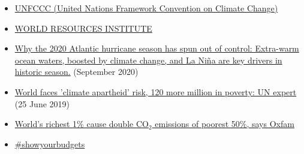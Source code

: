 \documentclass[12pt]{article}
\begin{document}
\begin{itemize}
 \vspace{-.2cm} \item \href{https://unfccc.int/}{UNFCCC (United Nations Framework Convention on Climate Change)} 
 \vspace{-.2cm} \item \href{https://www.wri.org/}{WORLD RESOURCES INSTITUTE} 
 \vspace{-.2cm} \item \href{https://www.washingtonpost.com/weather/2020/09/23/atlantic-hurricanes-record-2020/?utm_campaign=Carbon%20Brief%20Daily%20Briefing&utm_medium=email&utm_source=Revue%20newsletter}{Why the 2020 Atlantic hurricane season has spun out of control: Extra-warm ocean waters, boosted by climate change, and La Ni{\~n}a are key drivers in historic season.} (September 2020)
 \vspace{-.2cm} \item \href{https://news.un.org/en/story/2019/06/1041261}{World faces 'climate apartheid' risk, 120 more million in poverty: UN expert} (25 June 2019)
 \vspace{-.2cm} \item \href{https://www.theguardian.com/environment/2020/sep/21/worlds-richest-1-cause-double-co2-emissions-of-poorest-50-says-oxfam?utm_campaign=Carbon%20Brief%20Daily%20Briefing&utm_medium=email&utm_source=Revue%20newsletter}{World's richest 1\% cause double CO$_2$ emissions of poorest 50\%, says Oxfam} 
 \vspace{-.2cm} \item \href{https://www.showyourbudgets.org/de/?country=whole_world}{\#showyourbudgets} 
 \end{itemize}

 
\end{document}
